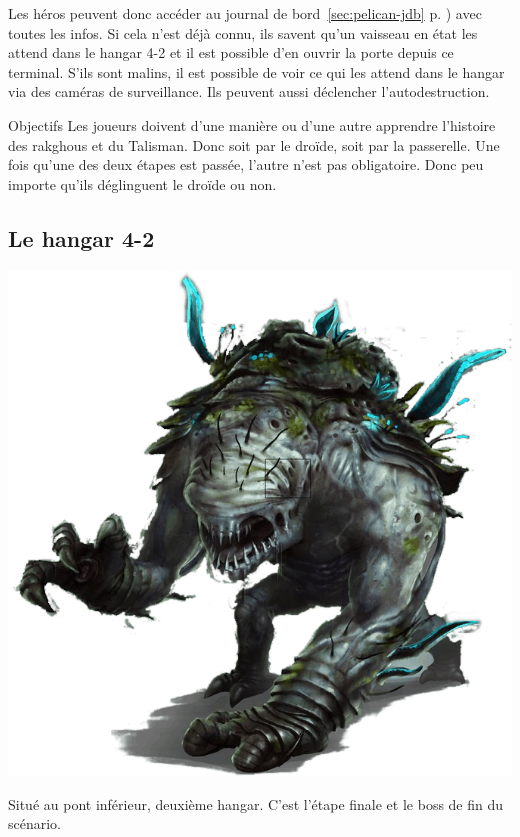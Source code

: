 Les héros peuvent donc accéder au journal de bord~\ref{sec:pelican-jdb} p. \pageref{sec:pelican-jdb}) avec toutes les infos. Si cela n’est déjà connu, ils savent qu’un vaisseau en état les attend dans le hangar 4-2 et il est possible d’en ouvrir la porte depuis ce terminal. S’ils sont malins, il est possible de voir ce qui les attend dans le hangar via des caméras de surveillance. Ils peuvent aussi déclencher l’autodestruction.

\begin{paperbox}{Objectifs}
Les joueurs doivent d’une manière ou d’une autre apprendre l’histoire des rakghous et du Talisman. Donc soit par le droïde, soit par la passerelle. Une fois qu’une des deux étapes est passée, l’autre n’est pas obligatoire. Donc peu importe qu’ils déglinguent le droïde ou non.
\end{paperbox}

\subsection{Le hangar 4-2}

\noindent\includegraphics[width=\linewidth]{_img/dos-au-muur/rakghoul-amblyope.png}

Situé au pont inférieur, deuxième hangar. C’est l’étape finale et le boss de fin du scénario.

